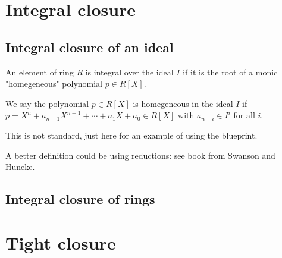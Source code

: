 %

\chapter{Integral closure}

\section{Integral closure of an ideal}

\begin{definition}[isIntegralElem]\label{defn:isIntegralElem}
    \leanok
    An element of ring $R$ is integral over the ideal $I$ if it is the root of a monic "homegeneous" 
    polynomial $p\in R[X]$.
\end{definition}

\begin{definition}[homogeneous]\label{defn:homogeneous}
    \leanok
    We say the polynomial $p\in R[X]$ is homegeneous in the ideal $I$ if
    $p = X^n + a_{n-1}X^{n-1} + \cdots + a_1 X + a_0\in R[X]$ with $a_{n-i} \in I^i$ for all $i$.

    This is not standard, just here for an example of using the blueprint.
\end{definition}

A better definition could be using reductions: see book from Swanson and Huneke.

\section{Integral closure of rings}

\chapter{Tight closure}
